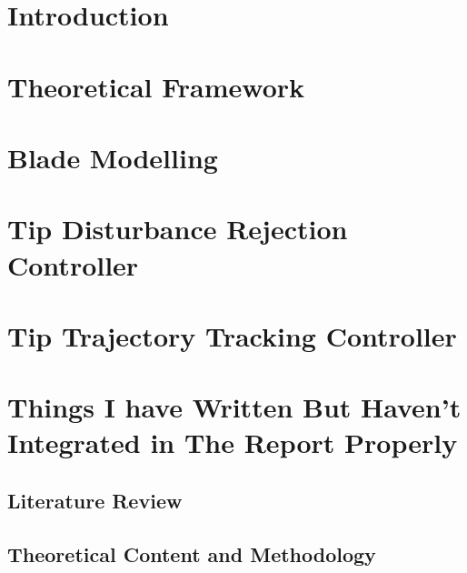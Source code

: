 
 \newcommand{\hinfty}{$\mathcal{H}_\infty$~} 
 \newcommand\norm[1]{\left\lVert#1\right\rVert}



%



\chapter{Introduction}


\chapter{Theoretical Framework}


\chapter{Blade Modelling}


\chapter{Tip Disturbance Rejection Controller}


\chapter{Tip Trajectory Tracking Controller}


\chapter{Things I have Written But Haven't Integrated in The Report Properly}
\section{Literature Review}


\section{Theoretical Content and Methodology}




